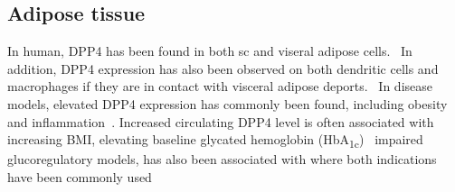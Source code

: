 \subsection{Adipose tissue}
In human, DPP4 has been found in both sc and viseral adipose cells.~\cite{Lamers2011} In addition, DPP4 expression has also been observed on both dendritic cells and macrophages if they are in contact with visceral adipose deports.~\cite{Zhong2013} In disease models, elevated DPP4 expression has commonly been found, including obesity and inflammation~\cite{Zhong2013}. Increased circulating DPP4 level is often associated with increasing BMI, elevating baseline glycated hemoglobin (HbA\textsubscript{1c})~\cite{2011}  impaired glucoregulatory models,  has also been associated with where both indications have been commonly used 